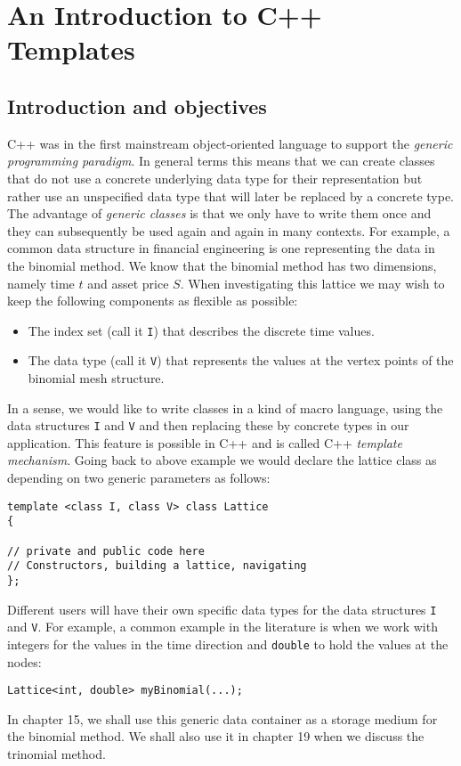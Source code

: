 \chapter{An Introduction to C++ Templates}

\section{Introduction and objectives}

C++ was in the first mainstream object-oriented language to support the \emph{generic programming paradigm}. In general terms this means that we can create classes that do not use a concrete underlying data type for their representation but rather use an unspecified data type that will later be replaced by a concrete type. The advantage of \emph{generic classes} is that we only have to write them once and they can subsequently be used again and again in many contexts. For example, a common data structure in financial engineering is one representing the data in the binomial method. We know that the binomial method has two dimensions, namely time $t$ and asset price $S$. When investigating this lattice we may wish to keep the following components as flexible as possible:
\begin{itemize}
	\item The index set (call it \texttt{I}) that describes the discrete time values.
	\item The data type (call it \texttt{V}) that represents the values at the vertex points of the binomial mesh structure.
\end{itemize}
In a sense, we would like to write classes in a kind of macro language, using the data structures \texttt{I} and \texttt{V} and then replacing these by concrete types in our application. This feature is possible in C++ and is called C++ \emph{template mechanism}. Going back to above example we would declare the lattice class as depending on two generic parameters as follows:
\begin{lstlisting}
template <class I, class V> class Lattice
{

// private and public code here
// Constructors, building a lattice, navigating
};
\end{lstlisting}
Different users will have their own specific data types for the data structures \texttt{I} and \texttt{V}. For example, a common example in the literature is when we work with integers for the values in the time direction and \texttt{double} to hold the values at the nodes:
\begin{lstlisting}
Lattice<int, double> myBinomial(...);
\end{lstlisting}
In chapter 15, we shall use this generic data container as a storage medium for the binomial method. We shall also use it in chapter 19 when we discuss the trinomial method.

